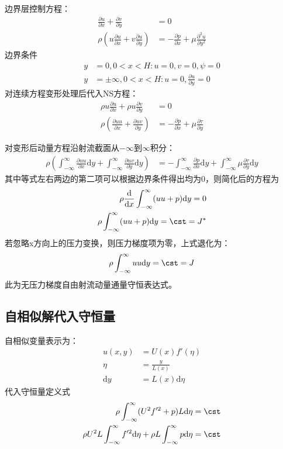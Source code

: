 边界层控制方程：
\begin{align}
    \frac{\partial u}{\partial x}+\frac{\partial v}{\partial y}&=0\\
    \rho\left(u\frac{\partial u}{\partial x}+v\frac{\partial u}{\partial y}\right)&=-\frac{\partial p}{\partial x}+\mu\frac{\partial^{2} u}{\partial y^{2}}
\end{align}
边界条件
\begin{align}
    y&=0, 0<x<H: u=0,v=0,\psi=0\\
    y&=\pm\infty,0<x<H: u=0, \frac{\partial u}{\partial y}=0
\end{align}
对连续方程变形处理后代入NS方程：
\begin{align}
    \rho u \frac{\partial u}{\partial x}+\rho u\frac{\partial v}{\partial y}&=0\\
    \rho\left(\frac{\partial uu}{\partial x}+\frac{\partial uv}{\partial y}\right)&=-\frac{\partial p}{\partial x}+\mu\frac{\partial \tau}{\partial y}
\end{align}

对变形后动量方程沿射流截面从$-\infty$到$\infty$积分：
\begin{align}
    \rho\left(\int_{-\infty}^{\infty}\frac{\partial uu}{\partial x}\mathrm{d}y+\int_{-\infty}^{\infty}\frac{\partial uv}{\partial y}\mathrm{d}y\right)&=-\int_{-\infty}^{\infty}\frac{\partial p}{\partial x}\mathrm{d}y+\int_{-\infty}^{\infty}\mu\frac{\partial \tau}{\partial y}\mathrm{d}y
\end{align}
其中等式左右两边的第二项可以根据边界条件得出均为0，则简化后的方程为
\begin{align}
    \rho\frac{\mathrm{d}}{\mathrm{d}x}\int_{-\infty}^{\infty}(uu+p)\mathrm{d}y=0\\
    \rho\int_{-\infty}^{\infty}(uu+p)\mathrm{d}y=\cst=J^{*}
\end{align}
若忽略x方向上的压力变换，则压力梯度项为零，上式退化为：
\begin{align}
     \rho\int_{-\infty}^{\infty}uu\mathrm{d}y=\cst=J
\end{align}
此为无压力梯度自由射流动量通量守恒表达式。

\subsection{自相似解代入守恒量}

自相似变量表示为：
\begin{align}
    u(x,y)&=U(x)f'(\eta)\\
    \eta&=\frac{y}{L(x)}\\
    \mathrm{d}y&=L(x)\mathrm{d}\eta
\end{align}
代入守恒量定义式
\begin{align}
    \rho\int_{-\infty}^{\infty}(U^{2}f'^{2}+p)L\mathrm{d}\eta=\cst\\
    \rho U^{2}L\int_{-\infty}^{\infty}f'^{2}\mathrm{d}\eta+\rho L\int_{-\infty}^{\infty}p\mathrm{d}\eta=\cst
\end{align}
